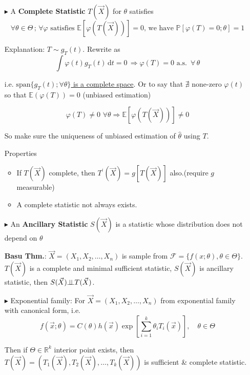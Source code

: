 \begin{itemize}
        \item[$\blacktriangleright$] A \textbf{Complete Statistic} $T(\vec{X})$ for $\theta$ satisfies
        \begin{equation}
            \forall\theta\in\Theta\, ;\,\forall\varphi\text{ satisfies }\mathbb{E}[\varphi(T(\vec{X}))]=0\text{, we have }\mathbb{P}[\varphi(T)=0;\theta]=1
        \end{equation}

        Explanation: $T\sim g_T(t)$. Rewrite as
        \begin{equation}
            \int\varphi (t) g_T(t)\,\mathrm{d} t=0  \, \Rightarrow\varphi(T)=0 \text{  a.s. }\,\forall\,\theta
        \end{equation}

        i.e. \underline{$\mathrm{span}\{g_T(t);\forall\theta\}$ is a complete space}. Or to say that $\nexists$ none-zero $\varphi(t)$ so that $\mathbb{E}(\varphi(T))=0$ (unbiased estimation)

        \begin{equation}
            \varphi(T)\neq 0 \,\,\forall \theta\Rightarrow \mathbb{E}[\varphi(T(\vec{X}))]\neq 0  
        \end{equation}

        So make sure the uniqueness of unbiased estimation of $\hat{\theta}$ using $T$.

        Properties
        \begin{itemize}
            \item If $T(\vec{X})$ complete, then $T^\prime(\vec{X})=g[T(\vec{X})]$ also.(require $g$ measurable)

            \item A complete statistic not always exists.
        \end{itemize}
        \item[$\blacktriangleright$]  An \textbf{Ancillary Statistic} $S(\vec{X})$ is a statistic whose distribution does not depend on $\theta$
        
        \textbf{Basu Thm.}: $\vec{X}=(X_1,X_2,\ldots,X_n)$ is sample from $\mathscr{F}=\{f(x;\theta),\theta\in\Theta\}$. $T(\vec{X})$ is a complete and minimal sufficient statistic, $S(\vec{X})$ is ancillary statistic, then $S(\vec{X})\bot\!\!\!\bot T(\vec{X})$.

        \item[$\blacktriangleright$] Exponential family: For $\vec{X}=(X_1,X_2,\ldots,X_n)$ from exponential family with canonical form, i.e.
    \begin{equation}
        f(\vec{x};\theta)=C(\theta)h(\vec{x})\exp\left[\sum_{i=1}^k \theta_i T_i(\vec{x})\right] ,\quad \theta\in\Theta
    \end{equation}

    Then if $\Theta\in\mathbb{R}^k$ interior point exists, then $T(\vec{X})=(T_1(\vec{X}),T_2(\vec{X}),\ldots,T_k(\vec{X}))$ is sufficient \& complete statistic.


\end{itemize} 




